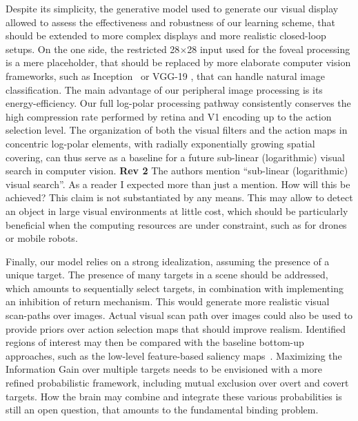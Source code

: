Despite its simplicity, the generative model used to generate our visual display allowed to assess the effectiveness and robustness of our learning scheme, that should be extended to more complex displays and more realistic closed-loop setups.
On the one side, the restricted 28$\times$28 input used for the foveal processing is a mere placeholder, that should be replaced by more elaborate computer vision frameworks, such as Inception~\cite{szegedy2015going} or VGG-19
\cite{simonyan2014very}, that can handle natural image classification. 
The main advantage of our peripheral image processing is its  energy-efficiency. Our full log-polar processing pathway consistently conserves the high compression rate performed by retina and V1 encoding up to the action selection level. The organization of both the visual filters and the action maps in concentric log-polar elements, with radially exponentially growing spatial covering, can thus serve as a baseline for a future sub-linear (logarithmic) visual search in computer vision. 
{\color{red} \textbf{Rev 2} The authors mention “sub-linear (logarithmic) visual search”. As a reader I expected more than just a mention. How will this be achieved? This claim is not substantiated by any means.}
This may allow to detect an object in large visual environments at little cost, which should be particularly beneficial when the computing resources are under constraint, such as for drones or mobile robots. 


Finally, our model relies on a strong idealization, assuming the presence of a unique target. The presence of many targets in a scene should be addressed, which amounts to sequentially select targets, in combination with implementing an inhibition of return mechanism. 
This would generate more realistic visual scan-paths over images. %
Actual visual scan path over images could also be used to provide priors over action selection maps that should improve realism.  %
Identified regions of interest may then be compared with the baseline bottom-up approaches, such as the low-level feature-based saliency maps~\cite{Itti01}. 
Maximizing the Information Gain over multiple targets needs to be envisioned with a more refined probabilistic framework, including mutual exclusion over overt and covert targets. How the brain may combine and integrate these various probabilities is still an open question, that amounts to the fundamental binding problem. %

